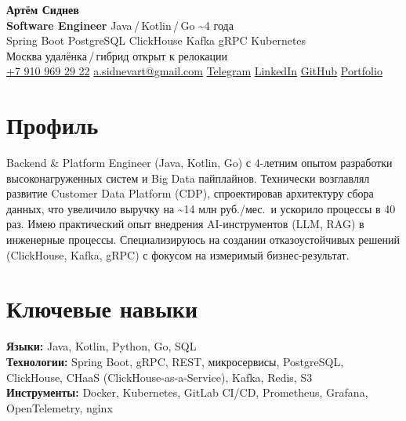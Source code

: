 \documentclass[10pt,a4paper]{article}
\newcommand{\contactsep}{\enspace\textbar\enspace}
\begin{document}
\fontsize{9.8pt}{11.4pt}\selectfont

\begin{center}
{\LARGE \textbf{Артём Сиднев}}\\[0.10em]
{\normalsize \textbf{Software Engineer} \textbullet{} Java\,/\,Kotlin\,/\,Go \textbullet{} \textasciitilde4 года}\\[0.12em]
{\footnotesize Spring Boot \textbullet{} PostgreSQL \textbullet{} ClickHouse \textbullet{} Kafka \textbullet{} gRPC \textbullet{} Kubernetes}\\[0.20em]
{\footnotesize Москва \textbullet{} удалёнка\,/\,гибрид \textbullet{} открыт к релокации}\\[0.20em]
{\footnotesize
\href{tel:+79109692922}{+7 910 969 29 22}
\contactsep \href{mailto:a.sidnevart@gmail.com}{a.sidnevart@gmail.com}
\contactsep \href{https://t.me/sidnevart}{Telegram}
\contactsep \href{https://www.linkedin.com/in/artem-sidnev-b109ab401/}{LinkedIn}
\contactsep \href{https://github.com/sidnevart}{GitHub}
\contactsep \href{https://sidnevart.github.io/personal-web-page/}{Portfolio}
}
\end{center}

\vspace{-0.14em}

\section*{Профиль}
Backend \& Platform Engineer (Java, Kotlin, Go) с 4-летним опытом разработки высоконагруженных систем и Big Data пайплайнов. Технически возглавлял развитие Customer Data Platform (CDP), спроектировав архитектуру сбора данных, что увеличило выручку на \textasciitilde14 млн руб./мес.\ и ускорило процессы в 40 раз. Имею практический опыт внедрения AI-инструментов (LLM, RAG) в инженерные процессы. Специализируюсь на создании отказоустойчивых решений (ClickHouse, Kafka, gRPC) с фокусом на измеримый бизнес-результат.

\section*{Ключевые навыки}
\textbf{Языки:} Java, Kotlin, Python, Go, SQL \\
\textbf{Технологии:} Spring Boot, gRPC, REST, микросервисы, PostgreSQL, ClickHouse, CHaaS (ClickHouse-as-a-Service), Kafka, Redis, S3 \\
\textbf{Инструменты:} Docker, Kubernetes, GitLab CI/CD, Prometheus, Grafana, OpenTelemetry, nginx
\end{document}
